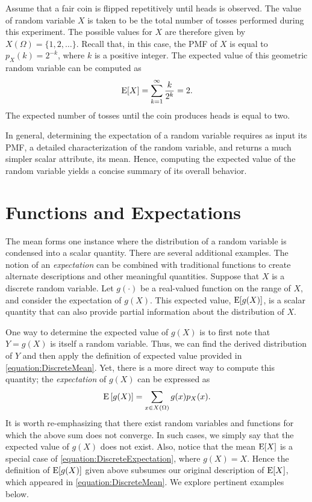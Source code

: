 \begin{example}
Assume that a fair coin is flipped repetitively until heads is observed.
The value of random variable $X$ is taken to be the total number of tosses performed during this experiment.
The possible values for $X$ are therefore given by $X (\Omega) = \{ 1, 2, \ldots \}$.
Recall that, in this case, the PMF of $X$ is equal to $p_X(k) = 2^{-k}$, where $k$ is a positive integer.
The expected value of this geometric random variable can be computed as
\begin{equation*}
\mathrm{E} [X] = \sum_{k=1}^{\infty} \frac{k}{2^k}
= 2.
\end{equation*}
The expected number of tosses until the coin produces heads is equal to two.
\end{example}

In general, determining the expectation of a random variable requires as input its PMF, a detailed characterization of the random variable, and returns a much simpler scalar attribute, its mean.
Hence, computing the expected value of the random variable yields a concise summary of its overall behavior.


\section{Functions and Expectations}

The mean forms one instance where the distribution of a random variable is condensed into a scalar quantity.
There are several additional examples.
The notion of an \emph{expectation} can be combined with traditional functions to create alternate descriptions and other meaningful quantities. 
Suppose that $X$ is a discrete random variable.
Let $g(\cdot)$ be a real-valued function on the range of $X$, and consider the expectation of $g(X)$.
This expected value, $\mathrm{E} [g(X)]$, is a scalar quantity that can also provide partial information about the distribution of $X$.

One way to determine the expected value of $g(X)$ is to first note that $Y = g(X)$ is itself a random variable.
Thus, we can find the derived distribution of $Y$ and then apply the definition of expected value provided in \eqref{equation:DiscreteMean}.
Yet, there is a more direct way to compute this quantity;
the \emph{expectation} of $g(X)$ can be expressed as 
\begin{equation} \label{equation:DiscreteExpectation}
\mathrm{E} \left[ g(X) \right]
= \sum_{x \in X(\Omega)} g(x) p_X (x) .
\end{equation}
It is worth re-emphasizing that there exist random variables and functions for which the above sum does not converge.
In such cases, we simply say that the expected value of $g(X)$ does not exist.
Also, notice that the mean $\mathrm{E} [X]$ is a special case of \eqref{equation:DiscreteExpectation}, where $g(X) = X$.
Hence the definition of $\mathrm{E} [g(X)]$ given above subsumes our original description of $\mathrm{E} [X]$, which appeared in \eqref{equation:DiscreteMean}.
We explore pertinent examples below.


